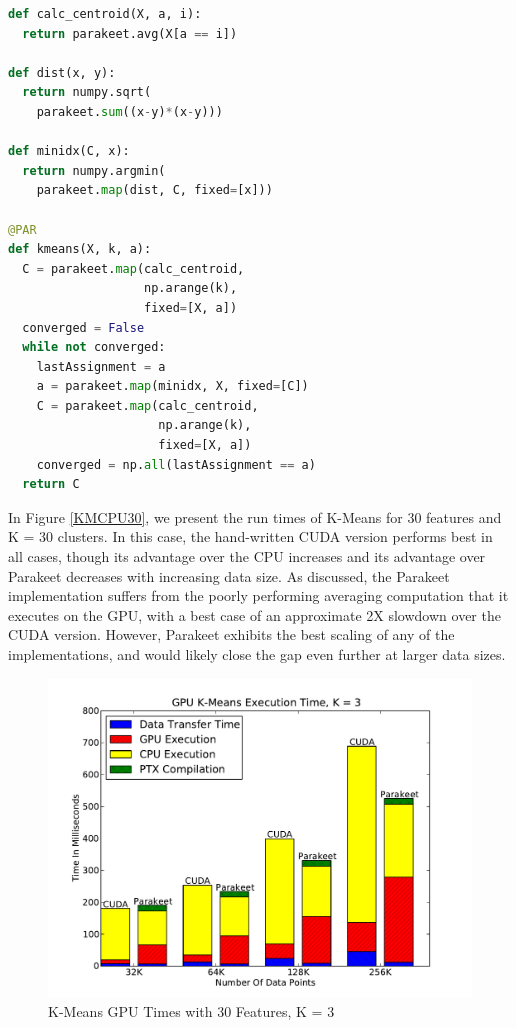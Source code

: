 \documentclass[10pt,twocolumn]{article}
\begin{document}
\begin{lstlisting}[language=Python,frame=single, label=K-Means-Code, caption={K-Means Parakeet Code}]
def calc_centroid(X, a, i):
  return parakeet.avg(X[a == i])

def dist(x, y):
  return numpy.sqrt(
    parakeet.sum((x-y)*(x-y)))

def minidx(C, x):
  return numpy.argmin(
    parakeet.map(dist, C, fixed=[x]))

@PAR
def kmeans(X, k, a):
  C = parakeet.map(calc_centroid,
                   np.arange(k),
                   fixed=[X, a])
  converged = False
  while not converged:
    lastAssignment = a
    a = parakeet.map(minidx, X, fixed=[C])
    C = parakeet.map(calc_centroid,
                     np.arange(k),
                     fixed=[X, a])
    converged = np.all(lastAssignment == a)
  return C
\end{lstlisting}

In Figure \ref{KMCPU30}, we present the run times of K-Means for 30 features and K = 30 clusters.  In this case, the hand-written CUDA version performs best in all cases, though its advantage over the CPU increases and its advantage over Parakeet decreases with increasing data size.  As discussed, the Parakeet implementation suffers from the poorly performing averaging computation that it executes on the GPU, with a best case of an approximate 2X slowdown over the CUDA version.  However, Parakeet exhibits the best scaling of any of the implementations, and would likely close the gap even further at larger data sizes.

\begin{figure}
\includegraphics[scale=0.4]{KMGPU.pdf}
\caption{K-Means GPU Times with 30 Features, K = 3}
\label{KMGPU}
\end{figure}
\end{document}
